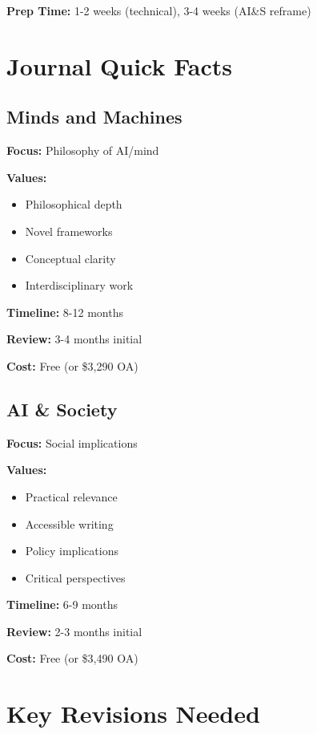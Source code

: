 \documentclass[12pt]{article}
\begin{document}
\textbf{Prep Time:} 1-2 weeks (technical), 3-4 weeks (AI\&S reframe)

\section*{Journal Quick Facts}

\begin{multicols}{2}

\subsection*{Minds and Machines}

\textbf{Focus:} Philosophy of AI/mind

\textbf{Values:}
\begin{itemize}[itemsep=0pt]
\item Philosophical depth
\item Novel frameworks
\item Conceptual clarity
\item Interdisciplinary work
\end{itemize}

\textbf{Timeline:} 8-12 months

\textbf{Review:} 3-4 months initial

\textbf{Cost:} Free (or \$3,290 OA)

\columnbreak

\subsection*{AI \& Society}

\textbf{Focus:} Social implications

\textbf{Values:}
\begin{itemize}[itemsep=0pt]
\item Practical relevance
\item Accessible writing
\item Policy implications
\item Critical perspectives
\end{itemize}

\textbf{Timeline:} 6-9 months

\textbf{Review:} 2-3 months initial

\textbf{Cost:} Free (or \$3,490 OA)

\end{multicols}

\section*{Key Revisions Needed}
\end{document}

